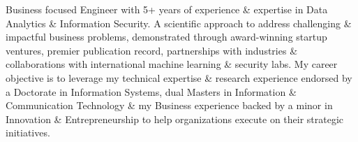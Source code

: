 

\begin{cvparagraph}

Business focused Engineer with 5+ years of experience \& expertise in Data Analytics \& Information Security. 
A scientific approach to address challenging \& impactful business problems, demonstrated through award-winning startup ventures, premier publication record, partnerships with industries \& collaborations with international machine learning \& security labs. 
My career objective is to leverage my technical expertise \& research experience endorsed by a Doctorate in Information Systems, dual Masters in Information \& Communication Technology \& my Business experience backed by a minor in Innovation \& Entrepreneurship to help organizations execute on their strategic initiatives.

\end{cvparagraph}
